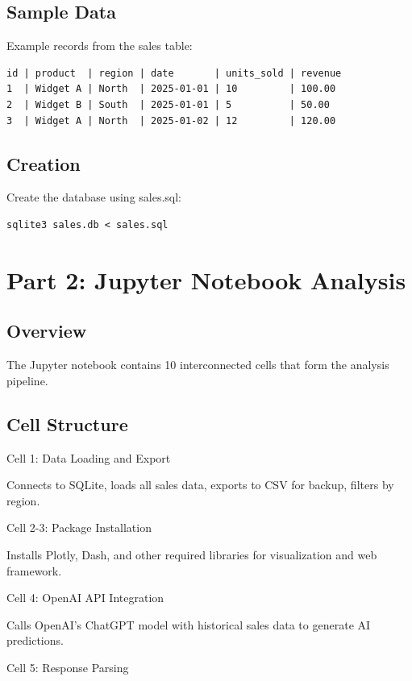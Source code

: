 \documentclass{article}
\begin{document}
\subsection{Sample Data}

Example records from the sales table:

\begin{verbatim}
id | product  | region | date       | units_sold | revenue
1  | Widget A | North  | 2025-01-01 | 10         | 100.00
2  | Widget B | South  | 2025-01-01 | 5          | 50.00
3  | Widget A | North  | 2025-01-02 | 12         | 120.00
\end{verbatim}

\subsection{Creation}

Create the database using sales.sql:

\begin{verbatim}
sqlite3 sales.db < sales.sql
\end{verbatim}

\section{Part 2: Jupyter Notebook Analysis}

\subsection{Overview}

The Jupyter notebook contains 10 interconnected cells that form the analysis pipeline.

\subsection{Cell Structure}

Cell 1: Data Loading and Export

Connects to SQLite, loads all sales data, exports to CSV for backup, filters by region.

Cell 2-3: Package Installation

Installs Plotly, Dash, and other required libraries for visualization and web framework.

Cell 4: OpenAI API Integration

Calls OpenAI's ChatGPT model with historical sales data to generate AI predictions.

Cell 5: Response Parsing
\end{document}
